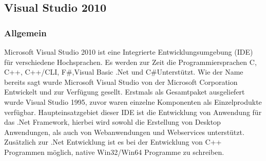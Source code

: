 \subsection{Visual Studio 2010}
\subsubsection{Allgemein}
Microsoft Visual Studio 2010 ist eine Integrierte Entwicklungsumgebung (IDE) für verschiedene Hochsprachen. Es werden zur Zeit die Programmiersprachen C, C++, C++/CLI, F\#,Visual Basic .Net und C\#Unterstützt.
Wie der Name bereits sagt wurde Microsoft Visual Studio von der Microsoft Corporation Entwickelt und zur Verfügung gesellt. Erstmals als Gesamtpaket ausgeliefert wurde Visual Studio 1995, zuvor waren einzelne Komponenten als Einzelprodukte verfügbar.
Haupteinsatzgebiet dieser IDE ist die Entwicklung von Anwendung für das .Net Framework, hierbei wird sowohl die Erstellung von Desktop Anwendungen, als auch von Webanwendungen und Webservices unterstützt.
Zusätzlich zur .Net Entwicklung ist es bei der Entwicklung von C++ Programmen möglich, native Win32/Win64 Programme zu schreiben. 
